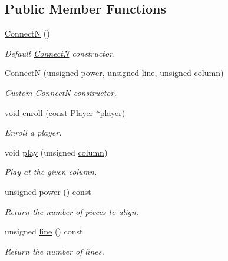 \subsection*{Public Member Functions}
\begin{DoxyCompactItemize}
\item 
\hyperlink{classConnectN_ae4c655de7116f32bf84ba01d8fa09455}{Connect\+N} ()
\begin{DoxyCompactList}\small\item\em Default \hyperlink{classConnectN}{Connect\+N} constructor. \end{DoxyCompactList}\item 
\hyperlink{classConnectN_aef059ecefe9eafeae4c9fa8806b14a43}{Connect\+N} (unsigned \hyperlink{classConnectN_a297db626a235c0bebfc276cb4b818cd6}{power}, unsigned \hyperlink{classConnectN_afc8593800090e0d19532e9bdeefabac9}{line}, unsigned \hyperlink{classConnectN_a40cc2c86197b7502276490ec1399b0b4}{column})
\begin{DoxyCompactList}\small\item\em Custom \hyperlink{classConnectN}{Connect\+N} constructor. \end{DoxyCompactList}\item 
void \hyperlink{classConnectN_aeacffa2ecadbf102749c668073df72ad}{enroll} (const \hyperlink{classPlayer}{Player} $\ast$player)
\begin{DoxyCompactList}\small\item\em Enroll a player. \end{DoxyCompactList}\item 
void \hyperlink{classConnectN_a1bb5f50f1e29d34c48cc9231afe76af6}{play} (unsigned \hyperlink{classConnectN_a40cc2c86197b7502276490ec1399b0b4}{column})
\begin{DoxyCompactList}\small\item\em Play at the given column. \end{DoxyCompactList}\item 
unsigned \hyperlink{classConnectN_a297db626a235c0bebfc276cb4b818cd6}{power} () const 
\begin{DoxyCompactList}\small\item\em Return the number of pieces to align. \end{DoxyCompactList}\item 
unsigned \hyperlink{classConnectN_afc8593800090e0d19532e9bdeefabac9}{line} () const 
\begin{DoxyCompactList}\small\item\em Return the number of lines. \end{DoxyCompactList}\item 

\end{DoxyCompactItemize}
